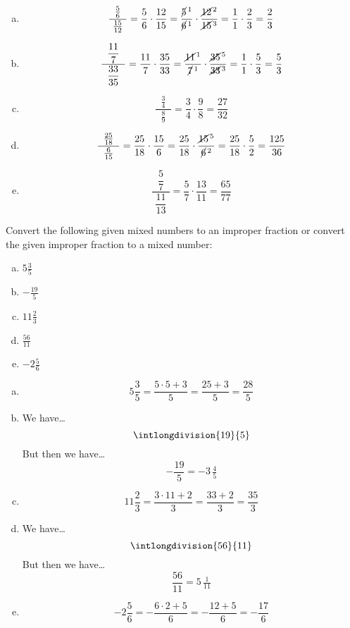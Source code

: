 \documentclass[11pt,letterpaper]{article}
\begin{document}
\sol 
\begin{enumerate}[(a)]
\item 
	\[
	\dfrac{\;\;\frac{5}{6}\;\;}{\frac{15}{12}}= \dfrac{5}{6} \cdot \dfrac{12}{15}= \dfrac{\cancel{5}^{\,1}}{\cancel{6}^{\,1}} \cdot \dfrac{\cancel{12}^{\,2}}{\cancel{15}^{\,3}}= \dfrac{1}{1} \cdot \dfrac{2}{3}= \dfrac{2}{3}
	\] \pspace

\item 
	\[
	\dfrac{\;\;\dfrac{11}{7}\;\;}{\dfrac{33}{35}}= \dfrac{11}{7} \cdot \dfrac{35}{33}= \dfrac{\cancel{11}^{\,1}}{\cancel{7}^{\,1}} \cdot \dfrac{\cancel{35}^{\,5}}{\cancel{33}^{\,3}}= \dfrac{1}{1} \cdot \dfrac{5}{3}= \dfrac{5}{3}
	\] \pspace

\item 
	\[
	\dfrac{\;\;\frac{3}{4}\;\;}{\frac{8}{9}}= \dfrac{3}{4} \cdot \dfrac{9}{8}= \dfrac{27}{32}
	\] \pspace

\item 
	\[
	\dfrac{\;\;\frac{25}{18}\;\;}{\frac{6}{15}}= \dfrac{25}{18} \cdot \dfrac{15}{6}= \dfrac{25}{18} \cdot \dfrac{\cancel{15}^{\,5}}{\cancel{6}^{\,2}}= \dfrac{25}{18} \cdot \dfrac{5}{2}= \dfrac{125}{36}
	\] \pspace

\item 
	\[
	\dfrac{\;\;\dfrac{5}{7}\;\;}{\dfrac{11}{13}}= \dfrac{5}{7} \cdot \dfrac{13}{11}= \dfrac{65}{77}
	\]
\end{enumerate}



\newpage



 Convert the following given mixed numbers to an improper fraction or convert the given improper fraction to a mixed number:
	\begin{enumerate}[(a)]
	\item $5 \frac{3}{5}$
	\item $-\frac{19}{5}$
	\item $11 \frac{2}{3}$
	\item $\frac{56}{11}$
	\item $-2 \frac{5}{6}$
	\end{enumerate} \pspace

\sol 
\begin{enumerate}[(a)]
\item 
	\[
	5 \frac{3}{5}= \dfrac{5 \cdot 5 + 3}{5}= \dfrac{25 + 3}{5}= \dfrac{28}{5}
	\] \pspace

\item We have\dots
	\[
	\intlongdivision{19}{5} %
	\] 
But then we have\dots
	\[
	- \dfrac{19}{5}= -3\, \tfrac{4}{5}
	\] \pspace

\item 
	\[
	11 \frac{2}{3}= \dfrac{3 \cdot 11 + 2}{3}= \dfrac{33 + 2}{3}= \dfrac{35}{3}
	\] \pspace

\item We have\dots
	\[
	\intlongdivision{56}{11} %
	\] 
But then we have\dots
	\[
	\frac{56}{11}= 5\, \tfrac{1}{11}
	\] \pspace

\item 
	\[
	-2 \frac{5}{6}= - \dfrac{6 \cdot 2 + 5}{6}= - \dfrac{12 + 5}{6}= -\dfrac{17}{6}
	\]
\end{enumerate}
\end{document}
